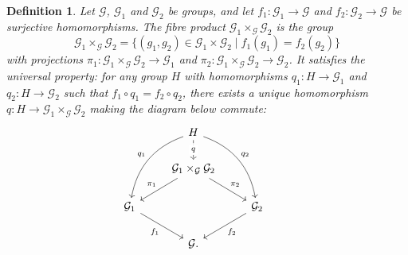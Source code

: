 \documentclass[11pt,reqno]{amsart}
\newtheorem{definition}[theorem]{Definition}
\newcommand{\cG}{\mathcal{G}}
\numberwithin{equation}{section}
\begin{document}
\begin{definition}
    Let \( \cG \), $\cG_1$ and $\cG_2$ be groups, and let \( f_1: \cG_1 \to \cG \) and \( f_2: \cG_2 \to \cG \) be surjective homomorphisms. The fibre product \( \cG_1 \times_\cG \cG_2 \) is the group  
\[
\cG_1 \times_\cG \cG_2 = \{ (g_1,g_2) \in \cG_1 \times \cG_2 \mid f_1(g_1) = f_2(g_2) \}
\]  
with projections \( \pi_1: \cG_1 \times_\cG \cG_2 \to \cG_1 \) and \( \pi_2: \cG_1 \times_\cG \cG_2 \to \cG_2 \). It satisfies the universal property: for any group \( H\) with homomorphisms \( q_1: H \to \cG_1 \) and \( q_2: H \to \cG_2 \) such that \( f_1 \circ q_1 = f_2\circ q_2 \), there exists a unique homomorphism \( q: H \to \cG_1 \times_\cG \cG_2 \) making the diagram below commute:
\[\begin{tikzcd}
{} & H
\arrow[bend right,swap]{ddl}{q_1}
\arrow[bend left]{ddr}{q_2}
\arrow[dashed]{d}[description]{q} & & \\
& \cG_1\times_\cG \cG_2 \arrow{dr}{\pi_2} \arrow{dl}[swap]{\pi_1} \\
\cG_1 \arrow[swap]{dr}{f_1} & & 
\cG_2 \arrow{dl}{f_2} \\
& \cG.
\end{tikzcd}
\]
\end{definition}
\end{document}
